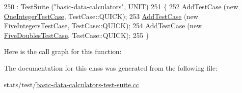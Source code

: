\begin{DoxyCode}
250   : \hyperlink{classns3_1_1TestSuite_a904b0c40583b744d30908aeb94636d1a}{TestSuite} (\textcolor{stringliteral}{"basic-data-calculators"}, \hyperlink{classns3_1_1TestSuite_a1ebfcab34ec8161e085e8e3a1855eae0a3885375a3787abf60431f8454b3cadbd}{UNIT})
251 \{
252   \hyperlink{classns3_1_1TestCase_a3718088e3eefd5d6454569d2e0ddd835}{AddTestCase} (\textcolor{keyword}{new} \hyperlink{classOneIntegerTestCase}{OneIntegerTestCase}, TestCase::QUICK);
253   \hyperlink{classns3_1_1TestCase_a3718088e3eefd5d6454569d2e0ddd835}{AddTestCase} (\textcolor{keyword}{new} \hyperlink{classFiveIntegersTestCase}{FiveIntegersTestCase}, TestCase::QUICK);
254   \hyperlink{classns3_1_1TestCase_a3718088e3eefd5d6454569d2e0ddd835}{AddTestCase} (\textcolor{keyword}{new} \hyperlink{classFiveDoublesTestCase}{FiveDoublesTestCase}, TestCase::QUICK);
255 \}
\end{DoxyCode}


Here is the call graph for this function\+:




The documentation for this class was generated from the following file\+:\begin{DoxyCompactItemize}
\item 
stats/test/\hyperlink{basic-data-calculators-test-suite_8cc}{basic-\/data-\/calculators-\/test-\/suite.\+cc}\end{DoxyCompactItemize}
